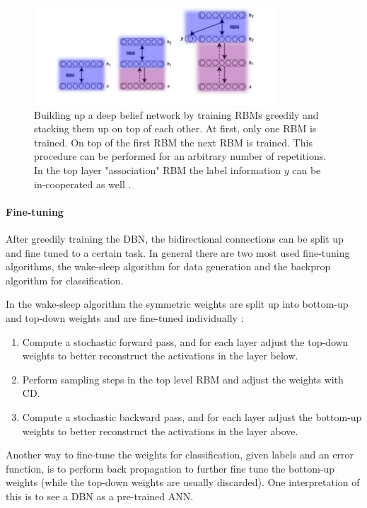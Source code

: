 \begin{figure}
	\centering
    	\includegraphics[width=0.8\textwidth]{imgs/dbn_stacking.png} 
    \caption[Building up a deep belief network.]{Building up a deep belief network by training RBMs greedily and stacking them up on top of each other. At first, only one RBM is trained. On top of the first RBM the next RBM is trained. This procedure can be performed for an arbitrary number of repetitions. In the top layer "association" RBM the label information $y$ can be in-cooperated as well \cite{DBNImg}.}
	\label{fig:dbn}
\end{figure}

\paragraph{Fine-tuning} \label{c:dbnfinetuning}

After greedily training the DBN, the bidirectional connections can be split up and fine tuned to a certain task.
In general there are two most used fine-tuning algorithms, the wake-sleep algorithm for data generation and the backprop algorithm for classification. 

In the wake-sleep algorithm the symmetric weights are split up into bottom-up and top-down weights and are fine-tuned individually \cite{hinton1995wake}:
\begin{enumerate}
\item Compute a stochastic forward pass, and for each layer adjust the top-down weights to better reconstruct the activations in the layer below.
\item Perform sampling steps in the top level RBM and adjust the weights with CD.
\item Compute a stochastic backward pass, and for each layer adjust the bottom-up weights to better reconstruct the activations in the layer above.
\end{enumerate}

Another way to fine-tune the weights for classification, given labels and an error function, is to perform back propagation to further fine tune the bottom-up weights (while the top-down weights are usually discarded). 
One interpretation of this is to see a DBN as a pre-trained ANN.

